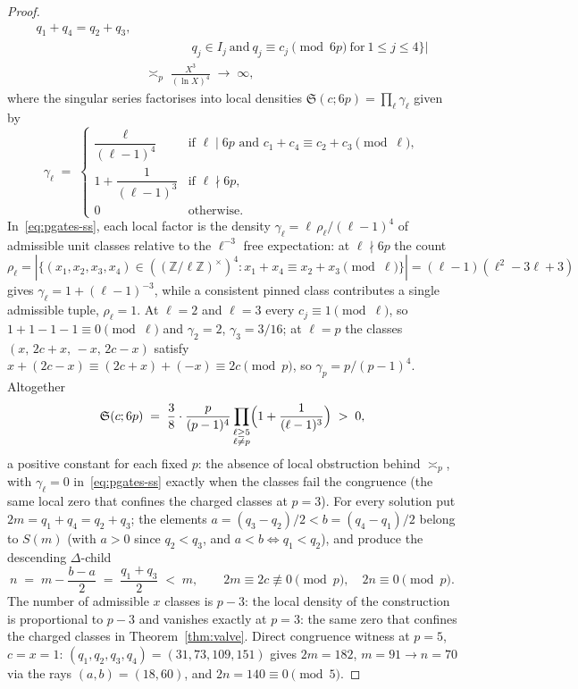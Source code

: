 \documentclass[11pt]{article}
\theoremstyle{plain}
\theoremstyle{definition}
\newcommand{\rays}{S}
\begin{document}
\begin{proof}
\begin{align*}
q_1 + q_4 = q_2 + q_3, \\
&\qquad\qquad q_j \in I_j \ \text{and}\
q_j \equiv c_j \pmod{6p} \ \text{for}\ 1 \le j \le 4\bigr\}\bigr| \\
&\;\asymp_{p}\; \frac{X^{3}}{(\ln X)^{4}} \;\longrightarrow\; \infty,
\end{align*}
where the singular series factorises into local densities
$\mathfrak{S}(c; 6p) = \prod_\ell \gamma_\ell$ given by
\begin{equation}\label{eq:pgates-ss}
\gamma_\ell \;=\;
\begin{cases}
\dfrac{\ell}{(\ell-1)^{4}} & \text{if } \ell \mid 6p
\text{ and } c_1 + c_4 \equiv c_2 + c_3 \pmod \ell,\\[1.2ex]
1 + \dfrac{1}{(\ell-1)^{3}} & \text{if } \ell \nmid 6p,\\[1.2ex]
0 & \text{otherwise.}
\end{cases}
\end{equation}
In~\eqref{eq:pgates-ss}, each local factor is the density
$\gamma_\ell = \ell\,\rho_\ell/(\ell-1)^{4}$ of admissible unit
classes relative to the $\ell^{-3}$ free expectation: at
$\ell \nmid 6p$ the count
$\rho_\ell = |\{(x_1,x_2,x_3,x_4) \in
((\mathbb{Z}/\ell\mathbb{Z})^{\times})^{4} :
x_1 + x_4 \equiv x_2 + x_3 \pmod \ell\}|
= (\ell-1)(\ell^{2} - 3\ell + 3)$ gives
$\gamma_\ell = 1 + (\ell-1)^{-3}$, while a consistent pinned
class contributes a single admissible tuple, $\rho_\ell = 1$. At
$\ell = 2$ and $\ell = 3$ every $c_j \equiv 1 \pmod \ell$, so
$1 + 1 - 1 - 1 \equiv 0 \pmod \ell$ and $\gamma_2 = 2$,
$\gamma_3 = 3/16$; at $\ell = p$ the classes
$(x,\, 2c + x,\, -x,\, 2c - x)$ satisfy
$x + (2c - x) \equiv (2c + x) + (-x) \equiv 2c \pmod p$, so
$\gamma_p = p/(p-1)^{4}$. Altogether
\[
\mathfrak{S}(c; 6p) \;=\;
\frac{3}{8}\cdot\frac{p}{(p-1)^{4}}
\prod_{\substack{\ell \ge 5\\ \ell \neq p}}
\Bigl(1 + \frac{1}{(\ell-1)^{3}}\Bigr) \;>\; 0,
\]
a positive constant for each fixed $p$: the absence of local
obstruction behind $\asymp_{p}$, with $\gamma_\ell = 0$
in~\eqref{eq:pgates-ss} exactly when the classes fail the
congruence (the same local zero that confines the charged classes
at $p = 3$). For every solution put $2m = q_1 + q_4 = q_2 + q_3$;
the elements $a = (q_3 - q_2)/2 < b = (q_4 - q_1)/2$ belong to
$\rays(m)$ (with $a > 0$ since $q_2 < q_3$, and
$a < b \iff q_1 < q_2$), and produce the descending $\Delta$-child
\[
n \;=\; m - \frac{b - a}{2} \;=\; \frac{q_1 + q_3}{2} \;<\; m,
\qquad 2m \equiv 2c \not\equiv 0 \pmod p, \quad
2n \equiv 0 \pmod p .
\]
The number of admissible $x$ classes is $p - 3$: the local
density of the construction is proportional to $p - 3$ and
vanishes exactly at $p = 3$: the same zero that confines the
charged classes in Theorem~\ref{thm:valve}. Direct congruence
witness at $p = 5$, $c = x = 1$:
$(q_1, q_2, q_3, q_4) = (31, 73, 109, 151)$ gives
$2m = 182$, $m = 91 \to n = 70$ via the rays
$(a, b) = (18, 60)$, and $2n = 140 \equiv 0 \pmod 5$.
\end{proof}
\end{document}
